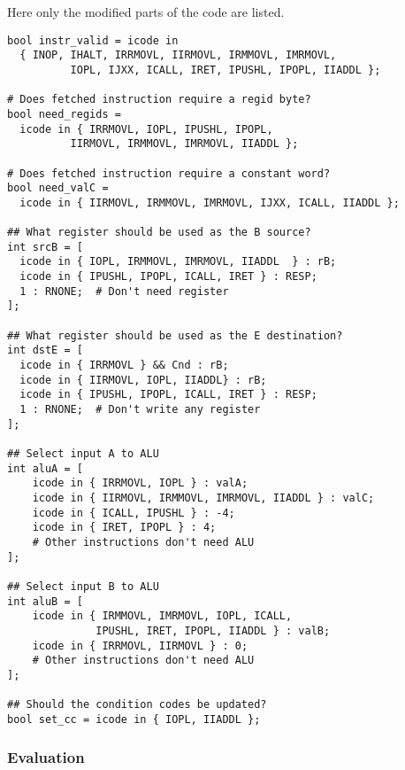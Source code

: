 \documentclass{article}
\begin{document}
Here only the modified parts of the code are listed.

\begin{lstlisting}
bool instr_valid = icode in
  { INOP, IHALT, IRRMOVL, IIRMOVL, IRMMOVL, IMRMOVL,
          IOPL, IJXX, ICALL, IRET, IPUSHL, IPOPL, IIADDL };

# Does fetched instruction require a regid byte?
bool need_regids =
  icode in { IRRMOVL, IOPL, IPUSHL, IPOPL,
          IIRMOVL, IRMMOVL, IMRMOVL, IIADDL };

# Does fetched instruction require a constant word?
bool need_valC =
  icode in { IIRMOVL, IRMMOVL, IMRMOVL, IJXX, ICALL, IIADDL };

## What register should be used as the B source?
int srcB = [
  icode in { IOPL, IRMMOVL, IMRMOVL, IIADDL  } : rB;
  icode in { IPUSHL, IPOPL, ICALL, IRET } : RESP;
  1 : RNONE;  # Don't need register
];

## What register should be used as the E destination?
int dstE = [
  icode in { IRRMOVL } && Cnd : rB;
  icode in { IIRMOVL, IOPL, IIADDL} : rB;
  icode in { IPUSHL, IPOPL, ICALL, IRET } : RESP;
  1 : RNONE;  # Don't write any register
];

## Select input A to ALU
int aluA = [
	icode in { IRRMOVL, IOPL } : valA;
	icode in { IIRMOVL, IRMMOVL, IMRMOVL, IIADDL } : valC;
	icode in { ICALL, IPUSHL } : -4;
	icode in { IRET, IPOPL } : 4;
	# Other instructions don't need ALU
];

## Select input B to ALU
int aluB = [
	icode in { IRMMOVL, IMRMOVL, IOPL, ICALL,
		      IPUSHL, IRET, IPOPL, IIADDL } : valB;
	icode in { IRRMOVL, IIRMOVL } : 0;
	# Other instructions don't need ALU
];

## Should the condition codes be updated?
bool set_cc = icode in { IOPL, IIADDL };
\end{lstlisting}

\subsubsection{Evaluation}
\end{document}
